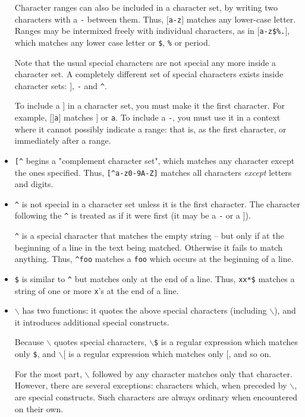 \begin{itemize}
Character ranges can also be included in a character set, by
writing two characters with a {\tt -} between them. Thus, {\tt $[$a-z$]$}
matches any lower-case letter. Ranges may be intermixed freely
with individual characters, as in {\tt $[$a-z\$\%.$]$}, which matches any
lower case letter or {\tt \$}, {\tt \%} or period.

Note that the usual special characters are not special any more
inside a character set. A completely different set of special
characters exists inside character sets: {\tt $]$}, {\tt -} and \verb$^$.

To include a {\tt $]$} in a character set, you must make it the first
character. For example, {\tt $[$$]$a$]$} matches {\tt $]$} or {\tt a}. To include
a {\tt -}, you must use it in a context where it cannot possibly
indicate a range: that is, as the first character, or
immediately after a range.

\item \rtfsp
\verb$[^$ begins a "complement character set", which matches any
character except the ones specified. Thus, \verb$[^a-z0-9A-Z]$
matches all characters {\it except} letters and digits.

\item \rtfsp
\verb$^$ is not special in a character set unless it is the first
character. The character following the \verb$^$ is treated as if it
were first (it may be a {\tt -} or a {\tt $]$}).

\verb$^$ is a special character that matches the empty string -- but only
if at the beginning of a line in the text being matched. 
Otherwise it fails to match anything. Thus, \verb$^foo$ matches a
{\tt foo} which occurs at the beginning of a line.

\item \rtfsp
{\tt \$} 
is similar to \verb$^$ but matches only at the end of a line. Thus,
{\tt xx*\$} matches a string of one or more {\tt x}'s at the end of a line.

\item \rtfsp
{\tt $\backslash$} 
has two functions: it quotes the above special characters
(including {\tt $\backslash$}), and it introduces additional special constructs.

Because {\tt $\backslash$} quotes special characters, {\tt $\backslash$\$} is a regular
expression which matches only {\tt \$}, and {\tt $\backslash$$[$} is a regular
expression which matches only {\tt $[$}, and so on.

For the most part, {\tt $\backslash$} followed by any character matches only
that character. However, there are several exceptions:
characters which, when preceded by {\tt $\backslash$}, are special constructs. 
Such characters are always ordinary when encountered on their own.


\end{itemize}
